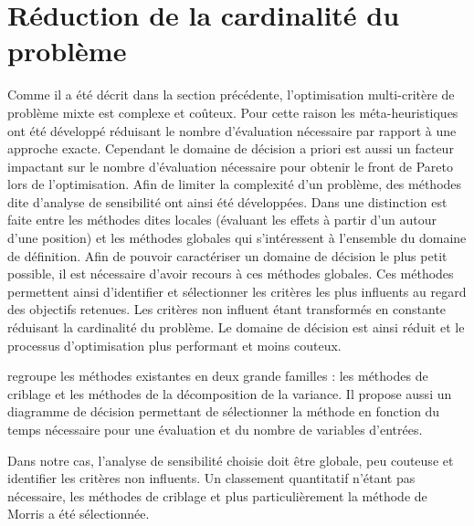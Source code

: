 \section{Réduction de la cardinalité du problème} %
\label{sec:reduction_de_la_cardinalite_du_probleme}

Comme il a été décrit dans la section précédente, l’optimisation multi-critère de
problème mixte est complexe et coûteux. Pour cette raison les méta-heuristiques
ont été développé réduisant le nombre d’évaluation nécessaire par rapport à une
approche exacte.
Cependant le domaine de décision a priori est aussi un facteur impactant sur le
nombre d’évaluation nécessaire pour obtenir le front de Pareto lors de l’optimisation.
Afin de limiter la complexité d’un problème, des méthodes dite d’analyse de sensibilité
ont ainsi été développées.
Dans \cite{Iooss2011} une distinction est faite entre les méthodes dites locales
(évaluant les effets à partir d’un autour d’une position) et les méthodes globales qui
s’intéressent à l’ensemble du domaine de définition. Afin de pouvoir caractériser
un domaine de décision le plus petit possible, il est nécessaire d’avoir recours à
ces méthodes globales.
Ces méthodes permettent ainsi d’identifier et sélectionner les critères les plus influents
au regard des objectifs retenues. Les critères non influent étant transformés en
constante réduisant la cardinalité du problème. Le domaine de décision est ainsi
réduit et le processus d’optimisation plus performant et moins couteux.

\cite{Iooss2011} regroupe les méthodes existantes en deux grande familles : les
méthodes de criblage et les méthodes de la décomposition de la variance. Il propose
aussi un diagramme de décision permettant de sélectionner la méthode en fonction
du temps nécessaire pour une évaluation et du nombre de variables d’entrées.

Dans notre cas, l’analyse de sensibilité choisie doit être globale, peu couteuse
et identifier les critères non influents. Un classement quantitatif n’étant pas
nécessaire, les méthodes de criblage et plus particulièrement la méthode de Morris
a été sélectionnée.



